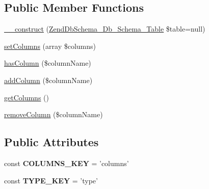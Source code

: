 \subsection*{Public Member Functions}
\begin{DoxyCompactItemize}
\item 
\hyperlink{classZendDbSchema__Db__Schema__Table__PrimaryKey_a8189591ab7ced58307298ecc8f27779d}{\-\_\-\-\_\-construct} (\hyperlink{classZendDbSchema__Db__Schema__Table}{Zend\-Db\-Schema\-\_\-\-Db\-\_\-\-Schema\-\_\-\-Table} \$table=null)
\item 
\hyperlink{classZendDbSchema__Db__Schema__Table__PrimaryKey_a01cfcffd92c38bc521628d49d5c74927}{set\-Columns} (array \$columns)
\item 
\hyperlink{classZendDbSchema__Db__Schema__Table__PrimaryKey_a97ed55c2479299d4e75e98154f12c409}{has\-Column} (\$column\-Name)
\item 
\hyperlink{classZendDbSchema__Db__Schema__Table__PrimaryKey_a0b84ee828c689a3da5790e123583f691}{add\-Column} (\$column\-Name)
\item 
\hyperlink{classZendDbSchema__Db__Schema__Table__PrimaryKey_a228207d6e07e3ab95b8b25415077a6a1}{get\-Columns} ()
\item 
\hyperlink{classZendDbSchema__Db__Schema__Table__PrimaryKey_a6deb586d1cc0935f5c0d50afa47667de}{remove\-Column} (\$column\-Name)
\end{DoxyCompactItemize}
\subsection*{Public Attributes}
\begin{DoxyCompactItemize}
\item 
\hypertarget{classZendDbSchema__Db__Schema__Table__PrimaryKey_a3486da1dd5b9a4cd1ca53a2041733752}{const {\bfseries C\-O\-L\-U\-M\-N\-S\-\_\-\-K\-E\-Y} = 'columns'}\label{classZendDbSchema__Db__Schema__Table__PrimaryKey_a3486da1dd5b9a4cd1ca53a2041733752}

\item 
\hypertarget{classZendDbSchema__Db__Schema__Table__PrimaryKey_a1d3949d08436d314ad01300bedcc600a}{const {\bfseries T\-Y\-P\-E\-\_\-\-K\-E\-Y} = 'type'}\label{classZendDbSchema__Db__Schema__Table__PrimaryKey_a1d3949d08436d314ad01300bedcc600a}

\end{DoxyCompactItemize}
